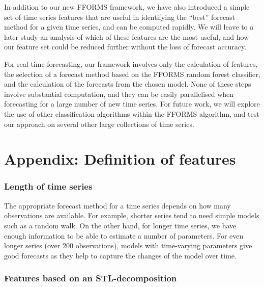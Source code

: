 \documentclass[11pt,a4paper,]{article}
\begin{document}
In addition to our new FFORMS framework, we have also introduced a
simple set of time series features that are useful in identifying the
``best'' forecast method for a given time series, and can be computed
rapidly. We will leave to a later study an analysis of which of these
features are the most useful, and how our feature set could be reduced
further without the loss of forecast accuracy.

For real-time forecasting, our framework involves only the calculation
of features, the selection of a forecast method based on the FFORMS
random forest classifier, and the calculation of the forecasts from the
chosen model. None of these steps involve substantial computation, and
they can be easily parallelised when forecasting for a large number of
new time series. For future work, we will explore the use of other
classification algorithms within the FFORMS algorithm, and test our
approach on several other large collections of time series.

\section*{Appendix: Definition of
features}\label{appendix-definition-of-features}

\subsubsection*{Length of time series}\label{length-of-time-series}

The appropriate forecast method for a time series depends on how many
observations are available. For example, shorter series tend to need
simple models such as a random walk. On the other hand, for longer time
series, we have enough information to be able to estimate a number of
parameters. For even longer series (over 200 observations), models with
time-varying parameters give good forecasts as they help to capture the
changes of the model over time.

\subsubsection*{Features based on an
STL-decomposition}\label{features-based-on-an-stl-decomposition}
\end{document}
